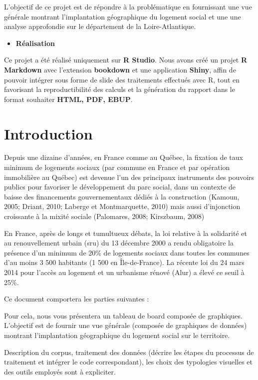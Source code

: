 \documentclass[
  french,
]{article}
\providecommand{\tightlist}{%
  \setlength{\itemsep}{0pt}\setlength{\parskip}{0pt}}
\begin{document}
L'objectif de ce projet est de répondre à la problématique en fournissant une vue générale montrant l'implantation géographique du logement social et une une analyse approfondie sur le département de la Loire-Atlantique.

\begin{itemize}
\tightlist
\item
  \textbf{Réalisation}
\end{itemize}

Ce projet a été réalisé uniquement sur \textbf{R Studio}. Nous avons créé un projet \textbf{R Markdown} avec l'extension \textbf{bookdown} et une application \textbf{Shiny}, affin de pouvoir intégrer sous forme de slide des traitements effectués avec R, tout en favorisant la reproductibilité des calculs et la génération du rapport dans le format souhaiter \textbf{HTML, PDF, EBUP}.

\newpage

\hypertarget{introduction}{%
\section{Introduction}\label{introduction}}

Depuis une dizaine d'années, en France comme au Québec, la fixation de taux minimum de logements sociaux (par commune en France et par opération immobilière au Québec) est devenue l'un des principaux instruments des pouvoirs publics pour favoriser le développement du parc social, dans un contexte de baisse des financements gouvernementaux dédiés à la construction (Kamoun, 2005; Driant, 2010; Laberge et Montmarquette, 2010) mais aussi d'injonction croissante à la mixité sociale (Palomares, 2008; Kirszbaum, 2008)

En France, après de longs et tumultueux débats, la loi relative à la solidarité et au renouvellement urbain (sru) du 13 décembre 2000 a rendu obligatoire la présence d'un minimum de 20\% de logements sociaux dans toutes les communes d'au moins 3 500 habitants (1 500 en Île-de-France). La récente loi du 24 mars 2014 pour l'accès au logement et un urbanisme rénové (Alur) a élevé ce seuil à 25\%.

Ce document comportera les parties suivantes :

Pour cela, nous vous présentera un tableau de board composée de graphiques.
L'objectif est de fournir une vue générale (composée de graphiques de données) montrant l'implantation géographique du logement social sur le territoire.

Description du corpus, traitement des données (décrire les étapes du processus de traitement et intégrer le code correspondant), les choix des typologies visuelles et des outils employés sont à expliciter.
\end{document}
